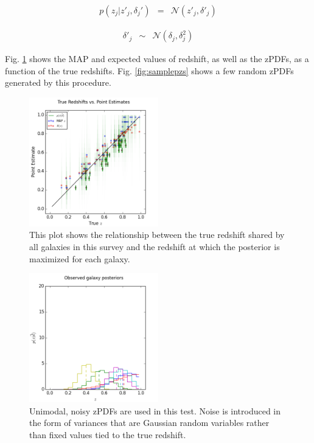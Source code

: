 \documentclass[preprint]{aastex}
\begin{document}
\begin{eqnarray}
\label{eq:zspread-noisy}
p(z_{j}|z'_{j},\delta_{j}') &=& \mathcal{N}(z'_{j},\delta'_{j})
\end{eqnarray}

\begin{eqnarray}
\label{eq:znoise}
\delta'_{j} &\sim& \mathcal{N}(\delta_{j},\delta^{2}_{j})
\end{eqnarray}

Fig. \ref{fig:noisycat} shows the MAP and expected values of redshift, as well as the zPDFs, as a function of the true redshifts.  Fig. \ref{fig:samplepzs} shows a few random zPDFs generated by this procedure.

\begin{figure}
\includegraphics[width=0.5\textwidth]{sigma/truevmap.png}
\caption{This plot shows the relationship between the true redshift shared by all galaxies in this survey and the redshift at which the posterior is maximized for each galaxy.}
\label{fig:noisycat}
\end{figure}

\begin{figure}
\includegraphics[width=0.5\textwidth]{sigma/samplepzs.png}
\caption{Unimodal, noisy zPDFs are used in this test.  Noise is introduced in the form of variances that are Gaussian random variables rather than fixed values tied to the true redshift.}
\label{fig:noisypzs}
\end{figure}
\end{document}
